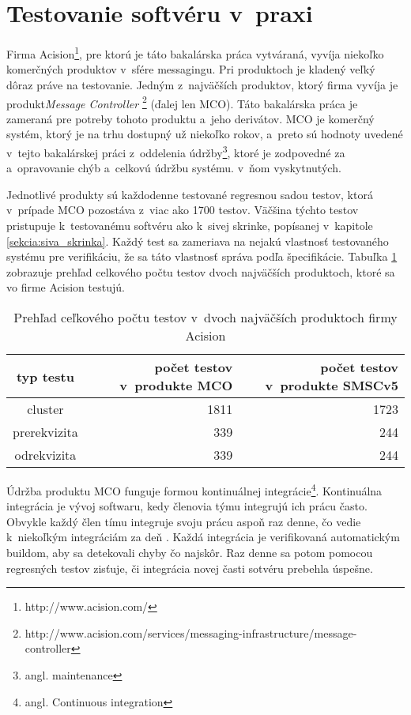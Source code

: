 \section{Testovanie softvéru v~praxi} 
\label{sekcia:testovanie_v_praxi}
Firma Acision\footnote{http://www.acision.com/}, pre ktorú je táto 
bakalárska práca vytváraná, vyvíja niekoľko komerčných produktov
v~sfére messagingu. Pri produktoch je kladený veľký dôraz práve na testovanie.
Jedným z~najväčších produktov, ktorý firma vyvíja je produkt\textit{Message Controller} 
\footnote{http://www.acision.com/services/messaging-infrastructure/message-controller}
(ďalej len MCO).
Táto bakalárska práca je zameraná pre potreby tohoto produktu a~jeho 
derivátov. MCO je komerčný systém, ktorý je na trhu dostupný už niekoľko 
rokov, a~preto sú hodnoty uvedené v~tejto bakalárskej práci z~oddelenia 
údržby\footnote{angl. maintenance}, ktoré je zodpovedné za a~opravovanie 
chýb a~celkovú údržbu systému.
v~ňom vyskytnutých. 

Jednotlivé produkty sú každodenne testované regresnou 
sadou testov, ktorá v~prípade MCO pozostáva z~viac ako 1700 testov.
Väčšina týchto testov pristupuje k~testovanému softvéru ako k~sivej 
skrinke, popísanej v~kapitole \ref{sekcia:siva_skrinka}.
Každý test sa zameriava na nejakú vlastnosť testovaného systému pre 
verifikáciu, že sa táto vlastnosť správa podľa špecifikácie.
Tabuľka \ref{tabulka:pocet_testov} zobrazuje prehľad celkového počtu 
testov dvoch najväčších produktoch, ktoré sa vo firme Acision testujú.

\begin{table}
  \begin{center}
    \begin{tabular}{| c | r | r |}
    \hline
    typ testu & počet testov v~produkte MCO & počet testov v~produkte SMSCv5 \\ \hline
    cluster & 1811 & 1723 \\ \hline
    prerekvizita & 339 & 244 \\ \hline
    odrekvizita & 339 & 244 \\
    \hline
    \end{tabular}
    \label{tabulka:pocet_testov}
    \caption{Prehľad ceľkového počtu testov v~dvoch najväčších produktoch firmy Acision}
  \end{center}
\end{table}

Údržba produktu MCO funguje formou kontinuálnej integrácie\footnote{angl. Continuous integration}.
Kontinuálna integrácia je vývoj softwaru, kedy členovia týmu integrujú
ich prácu často. Obvykle každý člen tímu integruje svoju prácu aspoň 
raz denne, čo vedie k~niekoľkým integráciám za deň \cite{Continuous_integration}.
Každá integrácia je verifikovaná automatickým buildom, aby sa detekovali 
chyby čo najskôr. Raz denne sa potom pomocou regresných testov zisťuje,
či integrácia novej časti sotvéru prebehla úspešne.

